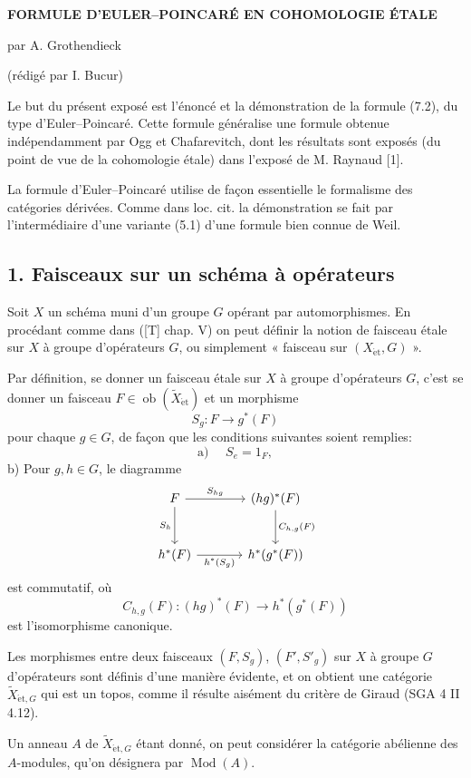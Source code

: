 \documentclass[11pt]{article}
\providecommand{\et}{\mathrm{\acute{e}t}}
\providecommand{\Ob}{\operatorname{ob}}
\providecommand{\Ob}{\operatorname{ob}}
\providecommand{\Ob}{\operatorname{Ob}}
\providecommand{\Mod}{\operatorname{Mod}}
\providecommand{\Ob}{\operatorname{ob}}
\providecommand{\Ob}{\operatorname{Ob}}
\providecommand{\et}{\acute{e}t}
\begin{document}
\begin{center}
\textbf{FORMULE D'EULER--POINCARÉ EN COHOMOLOGIE ÉTALE}

par A. Grothendieck

(rédigé par I. Bucur)
\end{center}

Le but du présent exposé est l'énoncé et la démonstration de la formule (7.2), du type d'Euler--Poincaré. Cette formule généralise une formule obtenue indépendamment par Ogg et Chafarevitch, dont les résultats sont exposés (du point de vue de la cohomologie étale) dans l'exposé de M. Raynaud [1].

La formule d'Euler--Poincaré utilise de façon essentielle le formalisme des catégories dérivées. Comme dans loc. cit. la démonstration se fait par l'intermédiaire d'une variante (5.1) d'une formule bien connue de Weil.

\subsection*{1. Faisceaux sur un schéma à opérateurs}

Soit $X$ un schéma muni d'un groupe $G$ opérant par automorphismes. En procédant comme dans ([T] chap. V) on peut définir la notion de faisceau étale sur $X$ à groupe d'opérateurs $G$, ou simplement « faisceau sur $(X_{\et},G)$ ».

Par définition, se donner un faisceau étale sur $X$ à groupe d'opérateurs $G$, c'est se donner un faisceau $F\in \Ob(\widetilde X_{\et})$ et un morphisme
\[
S_g:F\longrightarrow g^*(F)
\]
pour chaque $g\in G$, de façon que les conditions suivantes soient remplies:
\[
\text{a) }\quad S_e=1_F,
\]
b) Pour $g,h\in G$, le diagramme
\[
\begin{tikzcd}[column sep=large,row sep=large]
F \arrow[r,"S_{hg}"] \arrow[d,"S_h"'] & (hg)^*(F) \arrow[d,"C_{h,g}(F)"]\\
h^*(F) \arrow[r,"h^*(S_g)"'] & h^*(g^*(F))
\end{tikzcd}
\]
est commutatif, où
\[
C_{h,g}(F):(hg)^*(F)\longrightarrow h^*(g^*(F))
\]
est l'isomorphisme canonique.

Les morphismes entre deux faisceaux $(F,S_g)$, $(F',S'_g)$ sur $X$ à groupe $G$ d'opérateurs sont définis d'une manière évidente, et on obtient une catégorie $\widetilde X_{\et,G}$ qui est un topos, comme il résulte aisément du critère de Giraud (SGA 4 II 4.12).

Un anneau $A$ de $\widetilde X_{\et,G}$ étant donné, on peut considérer la catégorie abélienne des $A$-modules, qu'on désignera par $\Mod(A)$.
\end{document}
